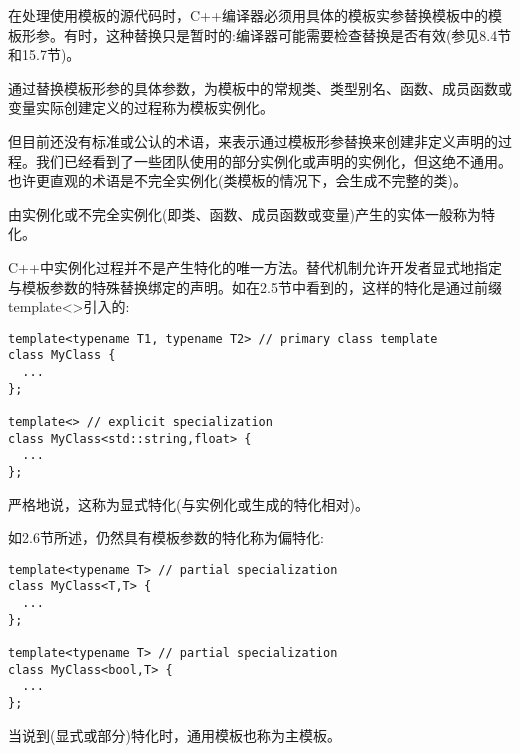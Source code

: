 在处理使用模板的源代码时，C++编译器必须用具体的模板实参替换模板中的模板形参。有时，这种替换只是暂时的:编译器可能需要检查替换是否有效(参见8.4节和15.7节)。

通过替换模板形参的具体参数，为模板中的常规类、类型别名、函数、成员函数或变量实际创建定义的过程称为模板实例化。

但目前还没有标准或公认的术语，来表示通过模板形参替换来创建非定义声明的过程。我们已经看到了一些团队使用的部分实例化或声明的实例化，但这绝不通用。也许更直观的术语是不完全实例化(类模板的情况下，会生成不完整的类)。

由实例化或不完全实例化(即类、函数、成员函数或变量)产生的实体一般称为特化。

C++中实例化过程并不是产生特化的唯一方法。替代机制允许开发者显式地指定与模板参数的特殊替换绑定的声明。如在2.5节中看到的，这样的特化是通过前缀template<>引入的:

\begin{lstlisting}[style=styleCXX]
template<typename T1, typename T2> // primary class template
class MyClass {
  ...
};

template<> // explicit specialization
class MyClass<std::string,float> {
  ...
};
\end{lstlisting}

严格地说，这称为显式特化(与实例化或生成的特化相对)。

如2.6节所述，仍然具有模板参数的特化称为偏特化:

\begin{lstlisting}[style=styleCXX]
template<typename T> // partial specialization
class MyClass<T,T> {
  ...
};

template<typename T> // partial specialization
class MyClass<bool,T> {
  ...
};
\end{lstlisting}

当说到(显式或部分)特化时，通用模板也称为主模板。
